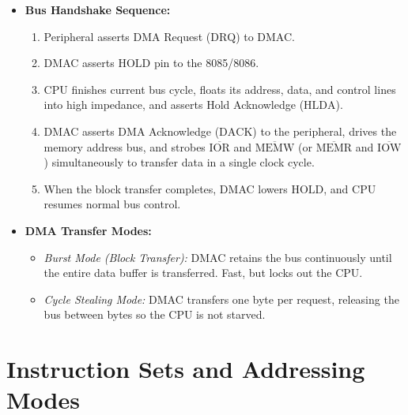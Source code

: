\documentclass[12pt,a4paper]{article}
\begin{document}
\begin{itemize}[leftmargin=*]
  \item \textbf{Bus Handshake Sequence:}
  \begin{enumerate}[leftmargin=*]
    \item Peripheral asserts DMA Request ($\mathrm{DRQ}$) to DMAC.
    \item DMAC asserts $\mathrm{HOLD}$ pin to the 8085/8086.
    \item CPU finishes current bus cycle, floats its address, data, and control lines into high impedance, and asserts Hold Acknowledge ($\mathrm{HLDA}$).
    \item DMAC asserts DMA Acknowledge ($\mathrm{DACK}$) to the peripheral, drives the memory address bus, and strobes $\overline{\mathrm{IOR}}$ and $\overline{\mathrm{MEMW}}$ (or $\overline{\mathrm{MEMR}}$ and $\overline{\mathrm{IOW}}$) simultaneously to transfer data in a single clock cycle.
    \item When the block transfer completes, DMAC lowers $\mathrm{HOLD}$, and CPU resumes normal bus control.
  \end{enumerate}
  \item \textbf{DMA Transfer Modes:}
  \begin{itemize}[leftmargin=*]
    \item \textit{Burst Mode (Block Transfer):} DMAC retains the bus continuously until the entire data buffer is transferred. Fast, but locks out the CPU.
    \item \textit{Cycle Stealing Mode:} DMAC transfers one byte per request, releasing the bus between bytes so the CPU is not starved.
  \end{itemize}
\end{itemize}

\section{Instruction Sets and Addressing Modes}
\end{document}
